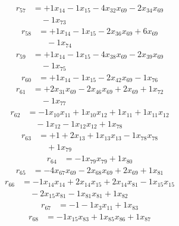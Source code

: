 \[\begin{aligned}
r_{57} &= + 1 x_{14} - 1 x_{15} - 4 x_{32} x_{69} - 2 x_{34} x_{69} \\
 &\quad - 1 x_{73}
\end{aligned}\]
\[\begin{aligned}
r_{58} &= + 1 x_{14} - 1 x_{15} - 2 x_{36} x_{69} + 6 x_{69} \\
 &\quad - 1 x_{74}
\end{aligned}\]
\[\begin{aligned}
r_{59} &= + 1 x_{14} - 1 x_{15} - 4 x_{38} x_{69} - 2 x_{39} x_{69} \\
 &\quad - 1 x_{75}
\end{aligned}\]
\[\begin{aligned}
r_{60} &= + 1 x_{14} - 1 x_{15} - 2 x_{42} x_{69} - 1 x_{76}
\end{aligned}\]
\[\begin{aligned}
r_{61} &= + 2 x_{31} x_{69} - 2 x_{46} x_{69} + 2 x_{69} + 1 x_{72} \\
 &\quad - 1 x_{77}
\end{aligned}\]
\[\begin{aligned}
r_{62} &= - 1 x_{10} x_{11} + 1 x_{10} x_{12} + 1 x_{11} + 1 x_{11} x_{12} \\
 &\quad - 1 x_{12} - 1 x_{12} x_{12} + 1 x_{78}
\end{aligned}\]
\[\begin{aligned}
r_{63} &= + 1 + 2 x_{13} + 1 x_{13} x_{13} - 1 x_{78} x_{78} \\
 &\quad + 1 x_{79}
\end{aligned}\]
\[\begin{aligned}
r_{64} &= - 1 x_{79} x_{79} + 1 x_{80}
\end{aligned}\]
\[\begin{aligned}
r_{65} &= - 4 x_{67} x_{69} - 2 x_{68} x_{69} + 2 x_{69} + 1 x_{81}
\end{aligned}\]
\[\begin{aligned}
r_{66} &= - 1 x_{14} x_{14} + 2 x_{14} x_{15} + 2 x_{14} x_{81} - 1 x_{15} x_{15} \\
 &\quad - 2 x_{15} x_{81} - 1 x_{81} x_{81} + 1 x_{82}
\end{aligned}\]
\[\begin{aligned}
r_{67} &= - 1 - 1 x_{3} x_{11} + 1 x_{83}
\end{aligned}\]
\[\begin{aligned}
r_{68} &= - 1 x_{15} x_{83} + 1 x_{85} x_{86} + 1 x_{87}
\end{aligned}\]
